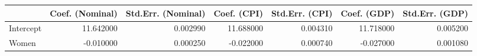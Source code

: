\begin{tabular}{lrrrrrr}
\toprule
 & Coef. (Nominal) & Std.Err. (Nominal) & Coef. (CPI) & Std.Err. (CPI) & Coef. (GDP) & Std.Err. (GDP) \\
\midrule
Intercept & 11.642000 & 0.002990 & 11.688000 & 0.004310 & 11.718000 & 0.005200 \\
Women & -0.010000 & 0.000250 & -0.022000 & 0.000740 & -0.027000 & 0.001080 \\
\bottomrule
\end{tabular}
